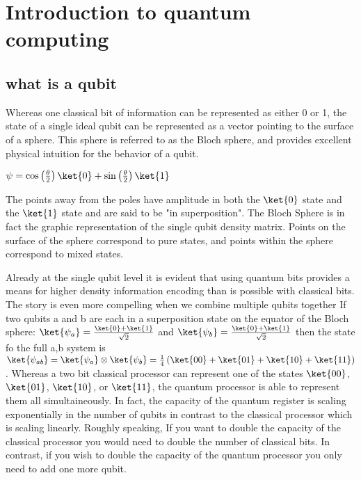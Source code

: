 \chapter{Introduction to quantum computing}
\section{what is a qubit}

Whereas one classical bit of information can be represented as either 0 or 1, the state of a single ideal qubit can be represented as a vector pointing to the surface of a sphere.
This sphere is referred to as the Bloch sphere, and provides excellent physical intuition for the behavior of a qubit.

{
}
{}
$\psi = \cos \left( \frac{\theta}{2} \right) \ket{0} + \sin \left( \frac{\theta}{2} \right)\ket{1} $

The points away from the poles have amplitude in both the $\ket{0}$ state and the $\ket{1}$ state and are said to be "in superposition".
The Bloch Sphere is in fact the graphic representation of the single qubit density matrix.
Points on the surface of the sphere correspond to pure states, and points within the sphere correspond to mixed states.

Already at the single qubit level it is evident that using quantum bits provides a means for higher density information encoding than is possible with classical bits.
The story is even more compelling when we combine multiple qubits together
If two qubits a and b are each in a superposition state on the equator of the Bloch sphere:
$\ket{\psi_a} = \frac{\ket{0}+\ket{1}}{\sqrt{2}}$ and $\ket{\psi_b} = \frac{\ket{0}+\ket{1}}{\sqrt{2}}$
then the state fo the full a,b system is
$\ket{\psi_{ab}} = \ket{\psi_a} \otimes \ket{\psi_b} = \frac{1}{4} \left( \ket{00} + \ket{01} + \ket{10} + \ket{11} \right)$.
Whereas a two bit classical processor can represent one of the states $\ket{00}$, $\ket{01}$, $\ket{10}$, or $\ket{11}$, the quantum processor is able to represent them all simultaineously.
In fact, the capacity of the quantum register is scaling exponentially in the number of qubits in contrast to the classical processor which is scaling linearly.
Roughly speaking, If you want to double the capacity of the classical processor you would need to double the number of classical bits.
In contrast, if you wish to double the capacity of the quantum processor you only need to add one more qubit.

